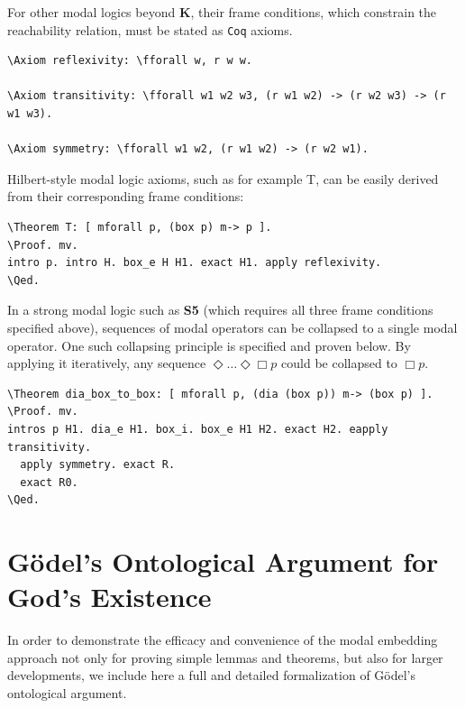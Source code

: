 \documentclass{llncs}
\newcommand{\nec}{\Box} %
\newcommand{\pos}{\Diamond} %
\newcommand{\red}[1]{\textcolor[rgb]{1,0,0}{#1}}
\newcommand{\blue}[1]{\textcolor[rgb]{0,0,1}{#1}}
\newcommand{\Axiom}{\red{Axiom}}
\newcommand{\Theorem}{\red{Theorem}}
\newcommand{\fforall}{\blue{forall}}
\newcommand{\Proof}{\blue{Proof}}
\newcommand{\Qed}{\blue{Qed}}
\newcommand{\Coq}{\texttt{Coq}\xspace}
\begin{document}
\noindent
For other modal logics beyond \textbf{K}, their frame conditions, which constrain 
the reachability relation, must be stated as \Coq axioms.

\begin{Verbatim}[commandchars=\\\{\},fontsize=\verbsize]
\Axiom reflexivity: \fforall w, r w w.

\Axiom transitivity: \fforall w1 w2 w3, (r w1 w2) -> (r w2 w3) -> (r w1 w3).

\Axiom symmetry: \fforall w1 w2, (r w1 w2) -> (r w2 w1).
\end{Verbatim}

\noindent
Hilbert-style modal logic axioms, such as for example T, 
can be easily derived from their corresponding frame conditions:

\begin{Verbatim}[commandchars=\\\{\},fontsize=\verbsize]
\Theorem T: [ mforall p, (box p) m-> p ].
\Proof. mv. 
intro p. intro H. box_e H H1. exact H1. apply reflexivity. 
\Qed.
\end{Verbatim}

\noindent
In a strong modal logic such as \textbf{S5} (which requires all three frame conditions specified above), sequences of modal operators can be collapsed to a single modal operator. One such collapsing principle is specified and proven below. By applying it iteratively, any sequence $\pos \ldots \pos \nec p$ could be collapsed to $\nec p$.

\begin{Verbatim}[commandchars=\\\{\},fontsize=\verbsize]
\Theorem dia_box_to_box: [ mforall p, (dia (box p)) m-> (box p) ].
\Proof. mv. 
intros p H1. dia_e H1. box_i. box_e H1 H2. exact H2. eapply transitivity. 
  apply symmetry. exact R. 
  exact R0.
\Qed.
\end{Verbatim}


\section{G\"odel's Ontological Argument for God's Existence}
\label{sec:proof}

In order to demonstrate the efficacy and convenience of the modal
embedding approach not only for proving simple lemmas and theorems,
but also for larger developments, we include here a full and detailed
formalization of G\"odel's ontological argument.
\end{document}
